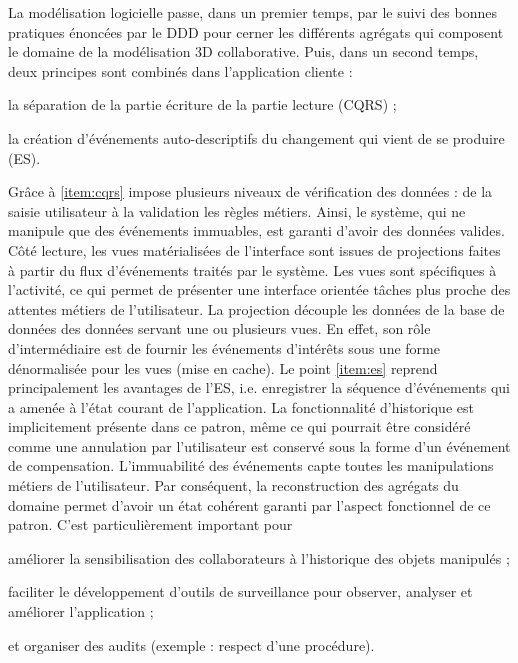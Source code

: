 La modélisation logicielle passe, 
dans un premier temps, par le suivi des bonnes pratiques énoncées par le 
\gls{DDD} pour cerner les différents agrégats qui composent le domaine de la 
modélisation 3D collaborative. 
Puis, dans un second temps, deux principes sont combinés dans l'application 
cliente : 
\begin{enumerate*}[label=(\roman*)]
	\item \label{item:cqrs}la séparation de la partie écriture de la partie lecture 
	(\gls{CQRS}) ;
	\item \label{item:es} la création d'événements auto-descriptifs du changement 
	qui vient de se 
	produire (\gls{ES}).
\end{enumerate*}
Grâce à \ref{item:cqrs} impose plusieurs niveaux de vérification des données : de 
la saisie utilisateur à la validation les règles métiers. Ainsi, le système, qui ne 
manipule que des événements immuables, est garanti d'avoir des données valides.
Côté lecture, les vues matérialisées de l'interface sont issues de projections faites 
à partir du flux d'événements traités par le système. Les vues sont spécifiques à 
l'activité, ce qui permet de présenter une interface orientée tâches plus proche des 
attentes métiers de l'utilisateur. La projection découple les données de la base 
de données des données servant une ou plusieurs vues. En effet, son rôle 
d'intermédiaire est de fournir les événements d'intérêts sous une forme 
dénormalisée pour les vues (mise en cache).
Le point \ref{item:es} reprend principalement les avantages de l'\gls{ES}, i.e. 
enregistrer la 
séquence d'événements qui a amenée à l'état courant de l'application. La 
fonctionnalité d'historique est implicitement présente dans ce patron, même ce qui 
pourrait être considéré comme une \og annulation\fg{} par l'utilisateur est conservé 
sous la forme d'un événement de compensation. L'immuabilité des événements 
capte toutes les manipulations métiers de l'utilisateur. Par conséquent, la 
reconstruction des agrégats du domaine permet d'avoir un état cohérent garanti 
par l'aspect fonctionnel de ce patron. C'est particulièrement important pour 
\begin{enumerate*}[label=(\roman*)]
	\item améliorer la sensibilisation des collaborateurs à l'historique des objets 
	manipulés ;
	\item faciliter le développement d'outils de surveillance pour observer, analyser 
	et améliorer l'application ;
	\item et organiser des audits (exemple : respect d'une procédure).
\end{enumerate*}
%

